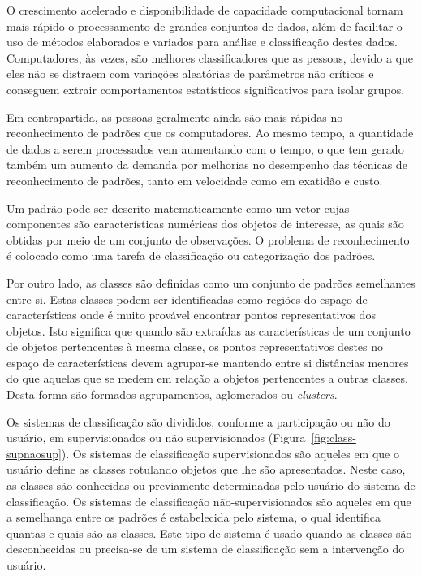 O crescimento acelerado e disponibilidade de capacidade computacional
tornam mais rápido o processamento de grandes conjuntos de dados, além
de facilitar o uso de métodos elaborados e variados para análise e
classificação destes dados. Computadores, às vezes, são melhores
classificadores que as pessoas, devido a que eles não se distraem com
variações aleatórias de parâmetros não críticos e conseguem extrair
comportamentos estatísticos significativos para isolar
grupos.\cite{114}

Em contrapartida, as pessoas geralmente ainda são mais rápidas no
reconhecimento de padrões que os computadores.\cite{114} Ao mesmo
tempo, a quantidade de dados a serem processados vem aumentando com o
tempo, o que tem gerado também um aumento da demanda por melhorias no
desempenho das técnicas de reconhecimento de padrões, tanto em
velocidade como em exatidão e custo.

Um padrão pode ser descrito matematicamente como um vetor cujas
componentes são características numéricas dos objetos de interesse, as
quais são obtidas por meio de um conjunto de
observações.\cite{118,119} O problema de reconhecimento é colocado
como uma tarefa de classificação ou categorização dos padrões.

Por outro lado, as classes são definidas como um conjunto de padrões
semelhantes entre si. Estas classes podem ser identificadas como
regiões do espaço de características onde é muito provável encontrar
pontos representativos dos objetos. Isto significa que quando são
extraídas as características de um conjunto de objetos pertencentes à
mesma classe, os pontos representativos destes no espaço de
características devem agrupar-se mantendo entre si distâncias menores
do que aquelas que se medem em relação a objetos pertencentes a outras
classes. Desta forma são formados agrupamentos, aglomerados ou
\textit{clusters}.\cite{30}

Os sistemas de classificação são divididos, conforme a participação ou
não do usuário, em supervisionados ou não supervisionados
(Figura~\ref{fig:class-supnaosup}).\cite{119} Os sistemas de
classificação supervisionados são aqueles em que o usuário define as
classes rotulando objetos que lhe são apresentados. Neste caso, as
classes são conhecidas ou previamente determinadas pelo usuário do
sistema de classificação. Os sistemas de classificação
não-supervisionados são aqueles em que a semelhança entre os padrões é
estabelecida pelo sistema, o qual identifica quantas e quais são as
classes. Este tipo de sistema é usado quando as classes são
desconhecidas ou precisa-se de um sistema de classificação sem a
intervenção do usuário.\cite{52}

